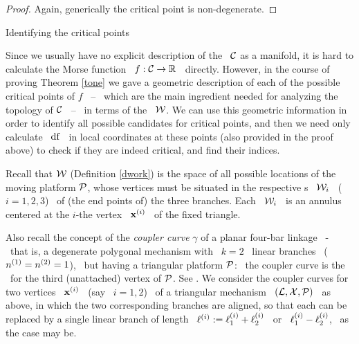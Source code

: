\begin{proof}
Again, generically the critical point is non-degenerate\vsm.
%
\end{proof}

\begin{mysubsect}[\label{scrit}]{Identifying the critical points}

Since we usually have no explicit description of the \cspace\ $\mathcal{C}$ as
a manifold, it is hard to calculate the Morse function \ $f:\mathcal{C}\to{\mathbb R}^{}$ \
directly. However, in the course of proving Theorem \ref{tone} we gave
a geometric description of each of the possible critical points of
$f$ \ -- \ which are the main ingredient needed for analyzing the
topology of $\mathcal{C}$ \ -- \ in terms of the \wspace\ $\mathcal{W}$. We can use
this geometric information in order to identify all possible
candidates for critical points, and then we need only calculate \
$\operatorname{df}$ \ in local coordinates at these points (also provided in the
proof above) to check if they are indeed critical, and find their indices.

Recall that $\mathcal{W}$ (Definition \ref{dwork}) is the space of all possible
locations of the moving platform $\mathcal{P}$, whose vertices must be
situated in the respective \wspace s \ $\mathcal{W}_{i}$ \ ($i=1,2,3$) \ of
(the end points of) the three branches.  Each \ $\mathcal{W}_{i}$ \ is an
annulus centered at the $i$-the vertex \ $\mathbf{x}\sp{({i})}$ \ of the fixed triangle.

Also recall the concept of the \emph{coupler curve} $\gamma$ of a
planar four-bar linkage \ - \ that is, a degenerate polygonal
mechanism with \ $k=2$ \ linear branches \ ($n\sp{({1})}=n\sp{({2})}=1$), \
but having a triangular platform $\mathcal{P}$: \ the coupler curve is the
\wspace\ for the third (unattached) vertex of $\mathcal{P}$. See
\cite[Ch.\ 4]{Ha}. We consider the coupler curves for two vertices \ $\mathbf{x}\sp{({i})}$ \
(say \ $i=1,2$) \ of a triangular mechanism  \ $(\mathcal{L},\mathcal{X},\mathcal{P})$ \ as
above, in which the two corresponding branches are aligned, so that
each can be replaced by a single linear branch of length \
$\ell\sp{({i})}:=\ell\sp{({i})}_{1}+\ell\sp{({i})}_{2}$ \ or \ $\ell\sp{({i})}_{1}-\ell\sp{({i})}_{2}$, \
as the case may be.


\end{mysubsect}

